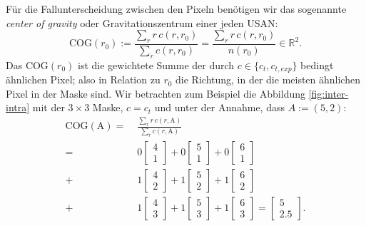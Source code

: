 \documentclass[a4paper, 11pt]{report}
\renewcommand{\emph}[1]{\textit{#1}}
\theoremstyle{definition}
\begin{document}
			Für die Fallunterscheidung zwischen den Pixeln benötigen wir das sogenannte \emph{center of gravity} oder Gravitationszentrum einer jeden USAN:
				$$ \text{COG}(r_0) := \frac	{\sum_r r\,c(r,r_0)} {\sum_r c(r,r_0)} = \frac	{\sum_r r\,c(r,r_0)} {n(r_0)} \in \mathbb{R}^2.$$
			Das $\text{COG}(r_0)$ ist die gewichtete Summe der durch $c \in \{c_t, c_{t,exp}\}$ bedingt ähnlichen Pixel; also in Relation zu $r_0$ die Richtung, in der die meisten ähnlichen Pixel in der Maske sind.
			Wir betrachten zum Beispiel die Abbildung \ref{fig:inter-intra} mit der $3\times3$ Maske, $c = c_t$ und unter der Annahme, dass $A := (5,2)$:
			\begin{align*}
				\text{COG}(\text{A})
				= &\;\frac{\sum_r r\,c(r,\text{A})} {\sum_r c(r, \text{A})} \\
				= &\;0\begin{bmatrix}4\\1\end{bmatrix} + 0\begin{bmatrix}5\\1\end{bmatrix} + 0\begin{bmatrix}6\\1\end{bmatrix} \\
				+ &\;1\begin{bmatrix}4\\2\end{bmatrix} + 1\begin{bmatrix}5\\2\end{bmatrix} + 1\begin{bmatrix}6\\2\end{bmatrix} \\
				+ &\;1\begin{bmatrix}4\\3\end{bmatrix} + 1\begin{bmatrix}5\\3\end{bmatrix} + 1\begin{bmatrix}6\\3\end{bmatrix} = \begin{bmatrix}5\\2.5\end{bmatrix}.
			\end{align*}
\end{document}
